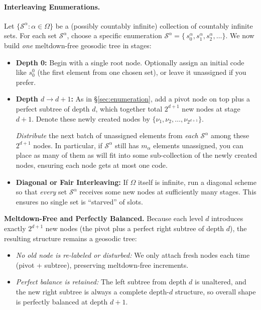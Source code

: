 \documentclass[11pt]{article}
\theoremstyle{definition}
\theoremstyle{remark}
\begin{document}
\paragraph{Interleaving Enumerations.}
Let $\{\mathcal{S}^\alpha : \alpha \in \Omega\}$ be a (possibly countably infinite) 
collection of countably infinite sets. For each set $\mathcal{S}^\alpha$, 
choose a specific enumeration 
$\mathcal{S}^\alpha = \{\,s^\alpha_0, s^\alpha_1, s^\alpha_2, \dots \}$. 
We now build \emph{one} meltdown-free geosodic tree in stages:

\begin{itemize}
    \item \textbf{Depth 0:} 
    Begin with a single root node. Optionally assign an initial code like $s^0_0$ 
    (the first element from one chosen set), or leave it unassigned if you prefer.

    \item \textbf{Depth $d \to d+1$:} 
    As in \S\ref{sec:enumeration}, add a pivot node on top plus a perfect subtree of depth $d$, 
    which together total $2^{d+1}$ new nodes at stage $d+1$. 
    Denote these newly created nodes by $\{\nu_1, \nu_2, \dots, \nu_{2^{d+1}}\}$.

    \emph{Distribute} the next batch of unassigned elements from \emph{each} $\mathcal{S}^\alpha$ 
    among these $2^{d+1}$ nodes. In particular, if $\mathcal{S}^\alpha$ still has 
    $m_\alpha$ elements unassigned, you can place as many of them as will fit 
    into some sub-collection of the newly created nodes, ensuring each node gets at most one code. 

    \item \textbf{Diagonal or Fair Interleaving:} 
    If $\Omega$ itself is infinite, run a diagonal scheme so that \emph{every} set $\mathcal{S}^\alpha$ 
    receives some new nodes at sufficiently many stages. This ensures no single set 
    is “starved” of slots. 
\end{itemize}

\noindent
\textbf{Meltdown-Free and Perfectly Balanced.}
Because each level $d$ introduces exactly $2^{d+1}$ new nodes (the pivot plus a perfect right subtree of depth $d$),
the resulting structure remains a geosodic tree:
\begin{itemize}
    \item \emph{No old node is re-labeled or disturbed:} We only attach fresh nodes 
    each time (pivot + subtree), preserving meltdown-free increments.
    \item \emph{Perfect balance is retained:} The left subtree from depth $d$ 
    is unaltered, and the new right subtree is always a complete depth-$d$ structure, 
    so overall shape is perfectly balanced at depth $d+1$.
\end{itemize}
\end{document}
